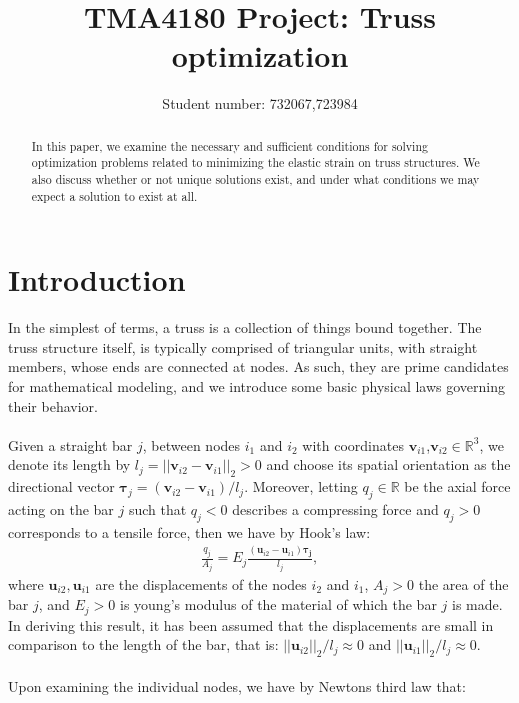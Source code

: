 \documentclass[10pt,a4paper]{article}
\begin{document}
\title{TMA4180 Project: Truss optimization}
\author{Student number: 732067,723984}
\maketitle
\begin{abstract}
\noindent
In this paper, we examine the necessary and sufficient conditions for solving optimization problems related to minimizing the elastic strain on truss structures. We also discuss whether or not unique solutions exist, and under what conditions we may expect a solution to exist at all.
\end{abstract}
\section{Introduction}
In the simplest of terms, a truss is a collection of things bound together. The truss structure itself, is typically comprised of triangular units, with straight members, whose ends are connected at nodes. As such, they are prime candidates for mathematical modeling, and we introduce some basic physical laws governing their behavior.
\\\\
Given a straight bar $j$, between nodes $i_1$ and $i_2$ with coordinates $\boldsymbol{v}_{i1}$,$\boldsymbol{v}_{i2}\in\mathbb{R}^3$, we denote its length by $l_j = ||\boldsymbol{v}_{i2} - \boldsymbol{v}_{i1}||_{2} > 0$ and choose its spatial orientation as the directional vector $\boldsymbol{\tau}_j = (\boldsymbol{v}_{i2}-\boldsymbol{v}_{i1})/l_j$. Moreover, letting $q_j\in\mathbb{R}$ be the axial force acting on the bar $j$ such that $q_j < 0$ describes a compressing force and $q_j > 0$ corresponds to a tensile force, then we have by Hook's law:
\begin{align}
\frac{q_j}{A_j} = E_j\frac{(\boldsymbol{u}_{i2}-\boldsymbol{u}_{i1})\boldsymbol{\tau_j}}{l_j} \label{eq: 1},
\end{align}
where $\boldsymbol{u}_{i2},\boldsymbol{u}_{i1}$ are the displacements of the nodes $i_2$ and $i_1$, $A_j>0$ the area of the bar $j$, and $E_j>0$ is young's modulus of the material of which the bar $j$ is made. In deriving this result, it has been assumed that the displacements are small in comparison to the length of the bar, that is: $||\boldsymbol{u}_{i2}||_2/l_j \approx 0$ and $||\boldsymbol{u}_{i1}||_2/l_j \approx 0$.
\\\\
Upon examining the individual nodes, we have by Newtons third law that:
\end{document}

